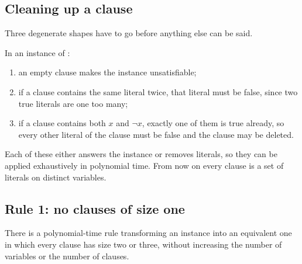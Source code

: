 \subsection{Cleaning up a clause}

Three degenerate shapes have to go before anything else can be said.

\begin{observation}\label{obs:x3sat-cleanup}
In an instance of :
\begin{enumerate}[label=(\roman*),leftmargin=*,nosep]
  \item an empty clause makes the instance unsatisfiable;
  \item if a clause contains the same literal twice, that literal must be
        false, since two true literals are one too many;
  \item if a clause contains both $x$ and $\neg x$, exactly one of them is true
        already, so every other literal of the clause must be false and the
        clause may be deleted.
\end{enumerate}
\end{observation}

Each of these either answers the instance or removes literals, so they can be
applied exhaustively in polynomial time. From now on every clause is a set of
literals on distinct variables.

\subsection{Rule 1: no clauses of size one}

\begin{lemma}\label{lem:x3sat-rule1}
There is a polynomial-time rule transforming an instance into an equivalent one
in which every clause has size two or three, without increasing the number of
variables or the number of clauses.
\end{lemma}

